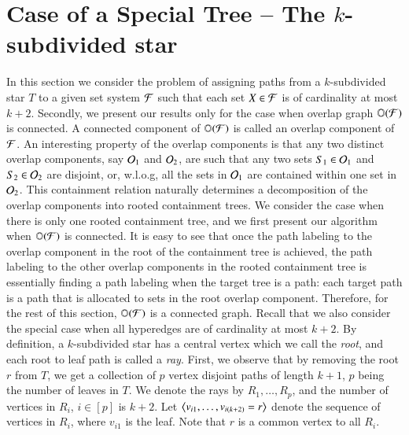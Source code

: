 \documentclass[MS,]{iitmdiss}
\begin{document}
\section{Case of a Special Tree -- The $k$-subdivided star}
\label{sec:ksubdivstar}
In this section we consider the problem of assigning paths from a
$k$-subdivided star $T$ to a given set system ${\cal F}$ such that each set
$X \in {\cal F}$ is of cardinality at most $k+2$.  Secondly, we present our
results only for the case when overlap graph $\mathbb O({\cal F})$ is connected.
A connected component of $\mathbb O({\cal F})$ is called an overlap component of
${\cal F}$.  An interesting property of the overlap components is that any
two distinct overlap components, say ${\cal O}_1$ and ${\cal O}_2$, are such
that any two sets $S_1 \in {\cal O}_1$ and $S_2 \in {\cal O}_2$ are disjoint,
or, w.l.o.g, all the sets in ${\cal O}_1$ are contained within one set in
${\cal O}_2$.  This containment relation naturally determines a
decomposition of the overlap components into rooted containment trees.
We consider the case when there is only one rooted containment tree,
and we first present our algorithm when $\mathbb O({\cal F})$ is connected.  It
is easy to see that once the path labeling to the overlap component in
the root of the containment tree is achieved, the path labeling to the
other overlap components in the rooted containment tree is essentially
finding a path labeling when the target tree is a path: each target
path is a path that is allocated to sets in the root overlap
component.  Therefore, for the rest of this section, $\mathbb O({\cal F})$ is a
connected graph. Recall that we also consider the special case when
all hyperedges are of cardinality at most $k+2$.  By definition, a
$k$-subdivided star has a central vertex which we call the {\em root},
and each root to leaf path is called a {\em ray}.  First, we observe
that by removing the root $r$ from $T$, we get a collection of $p$
vertex disjoint paths of length $k+1$, $p$ being the number of leaves
in $T$.  We denote the rays by $R_1, \ldots, R_p$, and the number of
vertices in $R_i$, $i \in [p]$ is $k+2$.  Let
$\left\langle v_{i1},\ldots,v_{i(k+2)}=r \right\rangle$ denote the sequence of vertices in
$R_i$, where $v_{i1}$ is the leaf. Note that $r$ is a common vertex to
all $R_i$.
  
\end{document}
